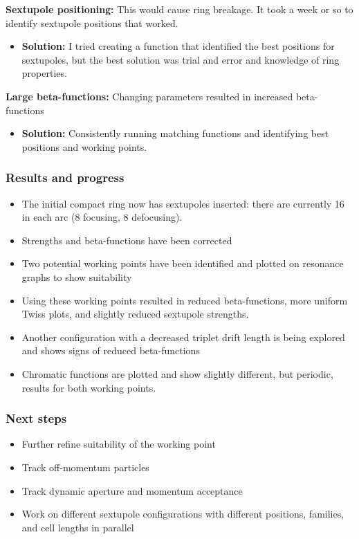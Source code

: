 \documentclass{article}
\begin{document}
\textbf{Sextupole positioning:} This would cause ring breakage. It took a week or so to identify sextupole positions that worked.
\begin{itemize}
    \item \textbf{Solution:} I tried creating a function that identified the best positions for sextupoles, but the best solution was trial and error and knowledge of ring properties.
\end{itemize}

\textbf{Large beta-functions:} Changing parameters resulted in increased beta-functions
\begin{itemize}
    \item \textbf{Solution:} Consistently running matching functions and identifying best positions and working points.
\end{itemize}

\subsubsection{Results and progress}
\begin{itemize}
    \item The initial compact ring now has sextupoles inserted: there are currently 16 in each arc (8 focusing, 8 defocusing).
    \item Strengths and beta-functions have been corrected
    \item Two potential working points have been identified and plotted on resonance graphs to show suitability
    \item Using these working points resulted in reduced beta-functions, more uniform Twiss plots, and slightly reduced sextupole strengths.
    \item Another configuration with a decreased triplet drift length is being explored and shows signs of reduced beta-functions
    \item Chromatic functions are plotted and show slightly different, but periodic, results for both working points.
\end{itemize}

\subsubsection{Next steps}
\begin{itemize}
    \item Further refine suitability of the working point
    \item Track off-momentum particles
    \item Track dynamic aperture and momentum acceptance
    \item Work on different sextupole configurations with different positions, families, and cell lengths in parallel
\end{itemize}
\end{document}
